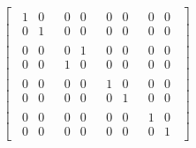 \documentclass[fleqn]{article}
\begin{document}
\[
  \left[
  \,
    \begin{array}{c|c|c|c}
      \begin{matrix}1&0\\0&1\end{matrix}
      & \begin{matrix}0&0\\0&0\end{matrix}
      & \begin{matrix}0&0\\0&0\end{matrix}
      & \begin{matrix}0&0\\0&0\end{matrix}
    \\\hline
    \begin{matrix}0&0\\0&0\end{matrix}
      & \begin{matrix}0&1\\1&0\end{matrix}
      & \begin{matrix}0&0\\0&0\end{matrix}
      & \begin{matrix}0&0\\0&0\end{matrix}
    \\\hline
    \begin{matrix}0&0\\0&0\end{matrix}
      & \begin{matrix}0&0\\0&0\end{matrix}
      & \begin{matrix}1&0\\0&1\end{matrix}
      & \begin{matrix}0&0\\0&0\end{matrix}
    \\\hline
    \begin{matrix}0&0\\0&0\end{matrix}
      & \begin{matrix}0&0\\0&0\end{matrix}
      & \begin{matrix}0&0\\0&0\end{matrix}
      & \begin{matrix}1&0\\0&1\end{matrix}
    \end{array}
  \,
  \right]
\]
\end{document}

